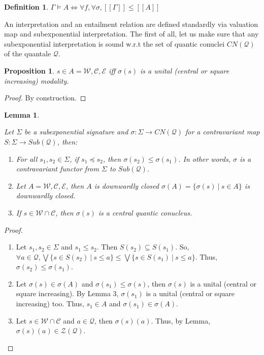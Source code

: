 \documentclass[a4paper]{article}
\theoremstyle{defin}
\newtheorem{defin}{Definition}
\theoremstyle{theorem}
\theoremstyle{prop}
\newtheorem{prop}{Proposition}
\theoremstyle{lemma}
\newtheorem{lemma}{Lemma}
\theoremstyle{ex}
\theoremstyle{col}
\begin{document}
\begin{defin}
  $\Gamma \models A \Leftrightarrow \forall f, \forall \sigma, [\![\Gamma]\!] \leq [\![A]\!]$
\end{defin}

An interpretation and an entailment relation are defined standardly via valuation map and subexponential interpretation.
The first of all, let us make sure that any subexponential interpretation is sound w.r.t the set of quantic conuclei $CN(\mathcal{Q})$ of the quantale $\mathcal{Q}$.

\begin{prop} $s \in A = \mathcal{W}, \mathcal{C}, \mathcal{E}$ iff $\sigma(s)$ is a unital (central or square increasing) modality.
\end{prop}

\begin{proof}
  By construction.
\end{proof}

\begin{lemma}
  $ $

  Let $\Sigma$ be a subexponential signature and $\sigma : \Sigma \to CN(\mathcal{Q})$ for a contravariant map
  $S : \Sigma \to Sub(\mathcal{Q})$, then:
  \begin{enumerate}
  \item For all $s_1, s_2 \in \Sigma$, if $s_1 \preceq s_2$, then $\sigma(s_2) \leq \sigma(s_1)$.
  In other words, $\sigma$ is a contravariant functor from $\Sigma$ to $Sub(\mathcal{Q})$.
  \item Let $A = \mathcal{W}, \mathcal{C}, \mathcal{E}$, then $A$ is downwardly closed
  $\sigma(A) = \{ \sigma(s) \: | \: s \in A \}$ is downwardly closed.
  \item If $s \in \mathcal{W} \cap \mathcal{C}$, then $\sigma(s)$ is a central quantic conucleus.
\end{enumerate}
\end{lemma}

\begin{proof}
  $ $

  \begin{enumerate}
  \item Let $s_1, s_2 \in \Sigma$ and $s_1 \leq s_2$. Then $S(s_2) \subseteq S(s_1)$.
  So, $\forall a \in \mathcal{Q}, \bigvee \{ s \in S(s_2) \: | \: s \leq a \} \leq \bigvee \{ s \in S(s_1) \: | \: s \leq a \}$. Thus, $\sigma(s_2) \leq \sigma(s_1)$.
  \item Let $\sigma(s) \in \sigma(A)$ and $\sigma(s_1) \leq \sigma(s)$, then $\sigma(s)$ is a unital (central or square increasing). By Lemma 3, $\sigma(s_1)$ is a unital (central or square increasing) too. Thus, $s_1 \in A$ and $\sigma(s_1) \in \sigma(A)$.
  \item Let $s \in \mathcal{W} \cap \mathcal{C}$ and $a \in \mathcal{Q}$,
  then $\sigma(s)(a)$. Thus, by Lemma, $\sigma(s)(a) \in \mathcal{Z}(\mathcal{Q})$.

\end{enumerate}
\end{proof}
\end{document}
